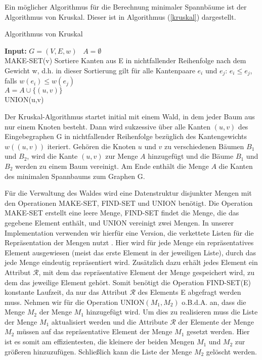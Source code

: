 \documentclass[a4paper,10pt]{article}
\begin{document}
Ein möglicher Algorithmus für die Berechnung minimaler Spannbäume ist der Algorithmus von Kruskal. Dieser ist in Algorithmus (\ref{kruskal}) dargestellt.
\begin{algorithm}
  \label{kruskal}
  \caption{Algorithmus von Kruskal}
      \textbf{Input: } $G = (V,E,w)$ \
      $A = \emptyset$ \\
      {
	  MAKE-SET(v)
      }
      Sortiere Kanten aus E in nichtfallender Reihenfolge nach dem Gewicht w, d.h. in dieser Sortierung gilt für alle Kantenpaare $e_i$ und $e_j$:
    $e_i \leq e_j$, falls $w(e_i) \leq w(e_j)$ \\
      {
	  {
	      $A = A \cup \{ (u,v) \}$ \\
	      UNION(u,v)
	  }
      }
  \hspace{1cm}
\end{algorithm}
\hspace{1cm}
Der Kruskal-Algorithmus startet initial mit einem Wald, in dem jeder Baum aus nur einem Knoten besteht. Dann wird sukzessive über alle Kanten $(u,v)$ des
Eingebegraphen G in nichtfallender Reihenfolge bezüglich des Kantengewichts $w((u,v))$
iteriert. Gehören die Knoten $u$ und $v$ zu verschiedenen Bäumen $B_1$ und $B_2$, wird die Kante
$(u,v)$ zur Menge $A$ hinzugefügt und die Bäume $B_1$ und $B_2$ werden zu einem Baum vereinigt. Am Ende enthält die Menge $A$ die Kanten des
minimalen Spannbaums zum Graphen G.

Für die Verwaltung des Waldes wird eine Datenstruktur disjunkter Mengen mit den Operationen MAKE-SET, FIND-SET und UNION benötigt. Die Operation MAKE-SET
erstellt eine leere Menge, FIND-SET findet die Menge, die das gegebene Element enthält, und UNION vereinigt zwei Mengen. In unserer Implementation
verwenden wir hierfür eine Version, die verkettete Listen für die Repräsentation der Mengen nutzt \cite[Kapitel 21.2]{cormen}. Hier wird für jede
Menge ein repräsentatives Element ausgewiesen (meist das erste Element in der jeweiligen Liste), durch das jede Menge eindeutig repräsentiert wird.
Zusätzlich dazu erhält jedes Element ein Attribut $\mathcal{R}$, mit dem das repräsentative Element der Menge gespeichert wird, zu dem das
jeweilige Element gehört.
Somit benötigt die Operation FIND-SET(E) konstante Laufzeit, da nur das Attribut $\mathcal{R}$ des Elements E abgefragt werden muss.
Nehmen wir für die Operation UNION$(M_1,M_2)$ o.B.d.A. an, dass die Menge $M_2$ der Menge $M_1$ hinzugefügt wird. Um dies zu realisieren muss die
Liste der Menge $M_1$ aktualisiert werden und die Attribute $\mathcal{R}$ der Elemente der Menge $M_2$ müssen auf das repräsentative Element der Menge
$M_1$ gesetzt werden. Hier ist es somit am effizientesten, die kleinere der beiden Mengen $M_1$ und $M_2$ zur größeren hinzuzufügen.
Schließlich kann die Liste der Menge $M_2$ gelöscht werden.
\end{document}
